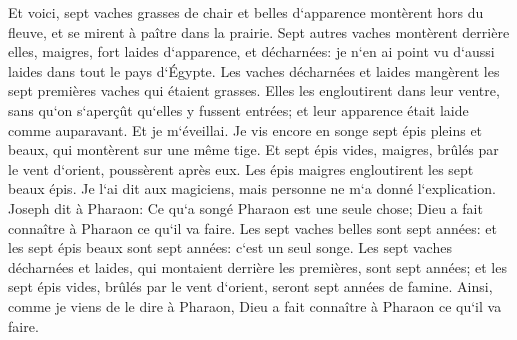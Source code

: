 \verse Et voici, sept vaches grasses de chair et belles d`apparence montèrent hors du fleuve, et se mirent à paître dans la prairie. 
\verse Sept autres vaches montèrent derrière elles, maigres, fort laides d`apparence, et décharnées: je n`en ai point vu d`aussi laides dans tout le pays d`Égypte. 
\verse Les vaches décharnées et laides mangèrent les sept premières vaches qui étaient grasses. 
\verse Elles les engloutirent dans leur ventre, sans qu`on s`aperçût qu`elles y fussent entrées; et leur apparence était laide comme auparavant. Et je m`éveillai. 
\verse Je vis encore en songe sept épis pleins et beaux, qui montèrent sur une même tige. 
\verse Et sept épis vides, maigres, brûlés par le vent d`orient, poussèrent après eux. 
\verse Les épis maigres engloutirent les sept beaux épis. Je l`ai dit aux magiciens, mais personne ne m`a donné l`explication. 
\verse Joseph dit à Pharaon: Ce qu`a songé Pharaon est une seule chose; Dieu a fait connaître à Pharaon ce qu`il va faire. 
\verse Les sept vaches belles sont sept années: et les sept épis beaux sont sept années: c`est un seul songe. 
\verse Les sept vaches décharnées et laides, qui montaient derrière les premières, sont sept années; et les sept épis vides, brûlés par le vent d`orient, seront sept années de famine. 
\verse Ainsi, comme je viens de le dire à Pharaon, Dieu a fait connaître à Pharaon ce qu`il va faire. 
